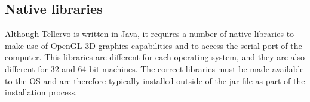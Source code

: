 





\subsection{Native libraries}
\label{txt:NativeLibraries}
Although Tellervo is written in Java, it requires a number of native libraries to make use of OpenGL 3D graphics capabilities and to access the serial port of the computer.  This libraries are different for each operating system, and they are also different for 32 and 64 bit machines.  The correct libraries must be made available to the OS and are therefore typically installed outside of the jar file as part of the installation process.  

